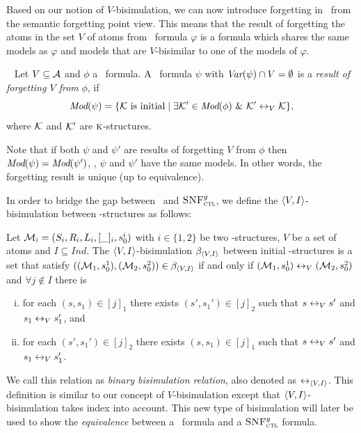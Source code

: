 \documentclass{article}
\begin{document}
Based on our notion of $V$-bisimulation, we can now introduce forgetting in \CTL\ from the semantic forgetting point view.
This means that the result of forgetting the atoms in the set $V$ of atoms from \CTL\ formula $\varphi$ is a formula which shares the same models as $\varphi$ and models that are $V$-bisimilar to one of the models of $\varphi$.
\begin{definition}[Forgetting]~\cite{renyansfirstpaper}\label{def:V:forgetting}
  Let $V\subseteq\cal A$ and $\phi$ a \CTL\ formula.
A \CTL\ formula $\psi$ with $\textit{Var}(\psi)\cap V=\emptyset$
is a {\em result of forgetting $V$ from} $\phi$, if
\begin{equation*}
  \textit{Mod}(\psi)=\{{\cal K}\mbox{ is initial}\mid \exists {\cal K}'\in\textit{Mod}(\phi)\ \&\ {\cal K}'\leftrightarrow_V{\cal K}\},
\end{equation*}
where $\cal K$ and ${\cal K}'$ are $\textsc{k}$-structures.
\end{definition}
Note that if both $\psi$ and $\psi'$ are results of forgetting $V$ from $\phi$ then
$\textit{Mod}(\psi)=\textit{Mod}(\psi')$, \ie, $\psi$ and $\psi'$ have the same models. In other words,  the forgetting result is unique (up to equivalence).


In order to bridge the gap between \CTL\ and ${\textsc{SNF}_{\textsc{ctl}}^g}$, %
we define the ${\langle{V,I}\rangle}$-bisimulation between \Ind-structures as follows:
\begin{definition} \label{def:VInd:bisimulation}
Let ${\cal M}_i=(S_i, R_i, L_i, [\_]_i, s_0^i)$ with $i\in \{1, 2\}$ be two \Ind-structures, $V$ be a set of atoms and $I \subseteq Ind$. The ${\langle{V,I}\rangle}$-bisimulation $\beta_{{\langle{V,I}\rangle}}$ between initial \Ind-structures is a set that satisfy $(({\cal M}_1, s_0^1), ({\cal M}_2, s_0^2)) \in \beta_{{\langle{V,I}\rangle}}$  if and only if $({\cal M}_1, s_0^1) \leftrightarrow_V ({\cal M}_2, s_0^2)$ and $\forall j \notin I$ there is
\begin{enumerate}[(i)]
  \item for each $(s, s_1)\in [j]_1$ there exists $(s',s_1')\in [j]_2$ such that $s\leftrightarrow_V s'$ and $s_1 \leftrightarrow_V s_1'$, and
  \item for each $(s', s_1')\in [j]_2$ there exists $(s,s_1)\in [j]_1$ such that $s\leftrightarrow_V s'$ and $s_1 \leftrightarrow_V s_1'$.
\end{enumerate}
\end{definition}
We call this relation as \emph{binary bisimulation relation}, also denoted as $\leftrightarrow_{{\langle{V,I}\rangle}}$. This definition is similar to our concept of $V$-bisimulation except that  ${\langle{V,I}\rangle}$-bisimulation takes index into account.
This new type of bisimulation will later be used to show the \emph{equivalence} between a \CTL\ formula and a ${\textsc{SNF}_{\textsc{ctl}}^g}$ formula.
\end{document}

